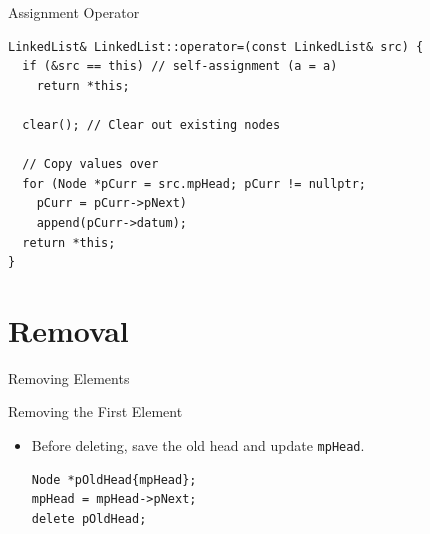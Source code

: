 \documentclass[14pt,aspectratio=1610, hyperref={pdfpagelayout=SinglePage}]{beamer}
\begin{document}
\begin{frame}[fragile]{Assignment Operator}
\begin{lstlisting}[basicstyle=\small\ttfamily]
LinkedList& LinkedList::operator=(const LinkedList& src) {
  if (&src == this) // self-assignment (a = a)
    return *this;

  clear(); // Clear out existing nodes

  // Copy values over
  for (Node *pCurr = src.mpHead; pCurr != nullptr;
    pCurr = pCurr->pNext)
    append(pCurr->datum);
  return *this;
}
\end{lstlisting}
\end{frame}


\section{Removal}

\begin{frame}{}
\centering
{\Large Removing Elements}
\\[3em]
\end{frame}

\begin{frame}[fragile]{Removing the First Element}
\begin{itemize}
\item Before deleting, save the old head and update \lstinline{mpHead}.\\
\begin{lstlisting}[basicstyle=\small\ttfamily]
Node *pOldHead{mpHead};
mpHead = mpHead->pNext;
delete pOldHead;
\end{lstlisting}%
\vspace{1em}
\end{itemize}
\begin{center}
\end{center}
\end{frame}
\end{document}
